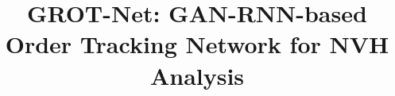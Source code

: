 \documentclass[journal,10pt]{IEEEtran}
\begin{document}
\graphicspath{ {./Images/} }
\title{ GROT-Net: GAN-RNN-based Order Tracking Network for NVH Analysis }


\maketitle







\ifCLASSOPTIONcaptionsoff
  \newpage
\fi


\end{document}
